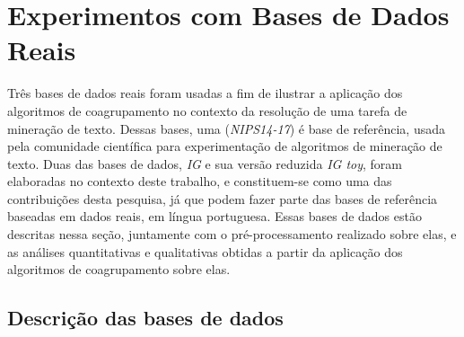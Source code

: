 \documentclass[
    12pt,                %
    oneside,            %
    a4paper,            %
    english,            %
    brazil                %
    ]{abntex2ppgsi}
\begin{document}






\section{Experimentos com Bases de Dados Reais}

Três bases de dados reais foram usadas a fim de ilustrar a aplicação dos algoritmos de coagrupamento no contexto da resolução de uma tarefa de mineração de texto.
Dessas bases, uma (\textit{NIPS14-17}) é base de referência, usada pela comunidade científica para experimentação de algoritmos de mineração de texto.
Duas das bases de dados, \textit{IG} e sua versão reduzida \textit{IG toy}, foram elaboradas no contexto deste trabalho, e constituem-se como uma das contribuições desta pesquisa, já que podem fazer parte das bases de referência baseadas em dados reais, em língua portuguesa.
Essas bases de dados estão descritas nessa seção, juntamente com o pré-processamento realizado sobre elas, e as análises quantitativas e qualitativas obtidas a partir da aplicação dos algoritmos de coagrupamento sobre elas.

\subsection{Descrição das bases de dados}
\end{document}

